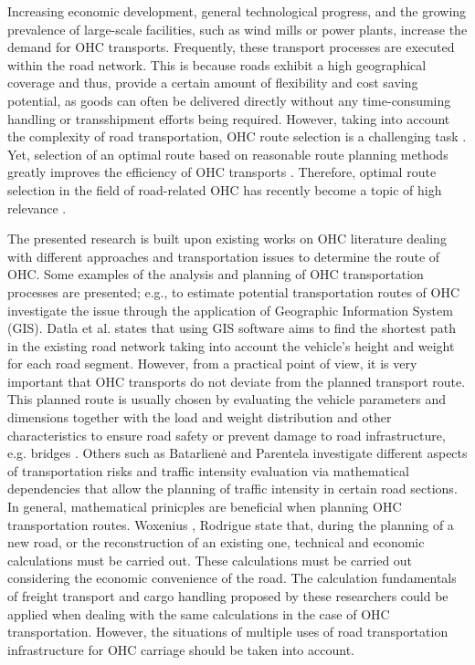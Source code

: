 %

Increasing economic development, general technological progress, and the growing prevalence of large-scale facilities, such as wind mills or power plants, increase the demand for OHC transports.
Frequently, these transport processes are executed within the road network. This is because roads exhibit a high geographical coverage and thus, provide a certain amount of flexibility and cost saving potential, as goods can often be delivered directly without any time-consuming handling or transshipment efforts being required. However, taking into account the complexity of road transportation, OHC route selection is a challenging task \cite{Bazaras.2013, xu2001methodology, sivilevicius2007dynamics}.
Yet, selection of an optimal route based on reasonable route planning methods greatly improves the efficiency of OHC transports \cite{meng2015optimized}.
Therefore, optimal route selection in the field of road-related OHC has recently become a topic of high relevance \cite{geisberger2011efficient}.
\par
 The presented research is built upon existing works on OHC literature dealing with different approaches and transportation issues to determine the route of OHC.
 Some examples of the analysis and planning of OHC transportation processes are presented; e.g., to estimate potential transportation routes of OHC \cite{durham2002gis} investigate the issue through the application of Geographic Information System (GIS).
 Datla et al. \cite{datla2004gis} states that using GIS software aims to find the shortest path in the existing road network taking into account the vehicle’s height and weight for each road segment. However, from a practical point of view, it is very important that OHC transports do not deviate from the planned transport route.
  This planned route is usually chosen by evaluating the vehicle parameters and dimensions together with the load and weight distribution and other characteristics to ensure road safety or prevent damage to road infrastructure, e.g. bridges \cite{ecmt2006improving, vaitkus2016effect, kombe2017modelling, pauer2017development}.
Others such as Batarlienė \cite{batarliene2007mobile} and Parentela \cite{parentela2002risk} investigate different aspects of transportation risks and traffic intensity evaluation via mathematical dependencies that allow the planning of traffic intensity in certain road sections.
In general, mathematical prinicples are beneficial when planning OHC transportation routes.
Woxenius \cite{woxenius2002organisation, woxenius2002conceptual}, Rodrigue \cite{rodrigue2020geography} state that, during the planning of a new road, or the reconstruction of an existing one, technical and economic calculations must be carried out.
These calculations must be carried out considering the economic convenience of the road.
The calculation fundamentals of freight transport and cargo handling proposed by these researchers could be applied when dealing with the same calculations in the case of OHC transportation. However, the situations of multiple uses of road transportation infrastructure for OHC carriage should be taken into account.

